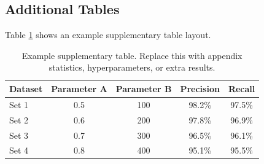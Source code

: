 \documentclass[10pt,a4paper,onecolumn]{class/sup}
\begin{document}
\subsection{Additional Tables}
Table \ref{tab:sup_table} shows an example supplementary table layout.

\begin{table}[h]
    \centering
    \caption{Example supplementary table. Replace this with appendix statistics, hyperparameters, or extra results.}
    \label{tab:sup_table}
    \begin{tabular}{lcccc}
        \toprule
        \textbf{Dataset} & \textbf{Parameter A} & \textbf{Parameter B} & \textbf{Precision} & \textbf{Recall} \\
        \midrule
        Set 1 & 0.5 & 100 & 98.2\% & 97.5\% \\
        Set 2 & 0.6 & 200 & 97.8\% & 96.9\% \\
        Set 3 & 0.7 & 300 & 96.5\% & 96.1\% \\
        Set 4 & 0.8 & 400 & 95.1\% & 95.5\% \\
        \bottomrule
    \end{tabular}
\end{table}

\printbibliography
\end{document}
